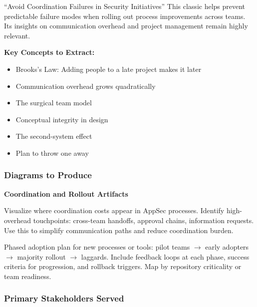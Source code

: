 \documentclass[11pt,letterpaper]{article}
\begin{document}
\begin{bookbox}{``Avoid Coordination Failures in Security Initiatives''}
This classic helps prevent predictable failure modes when rolling out process improvements across teams. Its insights on communication overhead and project management remain highly relevant.

\vspace{0.5cm}

\textbf{Key Concepts to Extract:}
\begin{itemize}[nosep]
    \item Brooks's Law: Adding people to a late project makes it later
    \item Communication overhead grows quadratically
    \item The surgical team model
    \item Conceptual integrity in design
    \item The second-system effect
    \item Plan to throw one away
\end{itemize}
\end{bookbox}

\subsubsection{Diagrams to Produce}

\begin{diagrambox}
\textbf{Coordination and Rollout Artifacts}

\begin{description}[leftmargin=1.5cm, style=nextline]
    \item[Communication and Handoff Map]
    Visualize where coordination costs appear in AppSec processes. Identify high-overhead touchpoints: cross-team handoffs, approval chains, information requests. Use this to simplify communication paths and reduce coordination burden.

    \item[Program Rollout Plan Diagram]
    Phased adoption plan for new processes or tools: pilot teams $\rightarrow$ early adopters $\rightarrow$ majority rollout $\rightarrow$ laggards. Include feedback loops at each phase, success criteria for progression, and rollback triggers. Map by repository criticality or team readiness.
\end{description}
\end{diagrambox}

\subsubsection{Primary Stakeholders Served}
\end{document}
